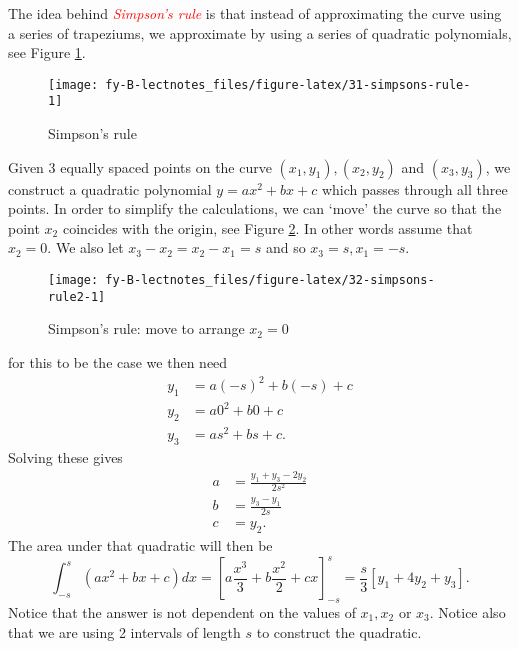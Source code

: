 \documentclass[
  11pt,
  oneside]{book}
\theoremstyle{definition}
\theoremstyle{definition}
\theoremstyle{definition}
\theoremstyle{definition}
\theoremstyle{remark}
\begin{document}
The idea behind \textcolor{red}{\em Simpson's rule} is that instead of approximating the curve using a series of trapeziums, we approximate by using a series of quadratic polynomials, see Figure \ref{fig:31-simpsons-rule}.

\begin{figure}

{\centering \texttt{[image: fy-B-lectnotes\_files/figure-latex/31-simpsons-rule-1]} 

}

\caption{Simpson's rule}\label{fig:31-simpsons-rule}
\end{figure}

Given 3 equally spaced points on the curve \((x_1,y_1), (x_2, y_2)\) and \((x_3,y_3)\), we construct a quadratic polynomial \(y=ax^2+bx+c\) which passes through all three points. In order to simplify the calculations, we can `move' the curve so that the point \(x_2\) coincides with the origin, see Figure \ref{fig:32-simpsons-rule2}. In other words assume that \(x_2=0\). We also let \(x_3-x_2=x_2-x_1=s\) and so \(x_3=s, x_1=-s\).

\begin{figure}

{\centering \texttt{[image: fy-B-lectnotes\_files/figure-latex/32-simpsons-rule2-1]} 

}

\caption{Simpson's rule: move to arrange $x_2=0$}\label{fig:32-simpsons-rule2}
\end{figure}

for this to be the case we then need
\begin{align*}
y_1&=a(-s)^2+b(-s)+c\\
y_2&=a0^2+b0+c\\
y_3&=as^2+bs+c.
\end{align*}
Solving these gives
\begin{align*}
a&=\frac{y_1+y_3-2y_2}{2s^2}\\
b&=\frac{y_3-y_1}{2s}\\
c&=y_2.
\end{align*}
The area under that quadratic will then be
\[
\int_{-s}^{s}(ax^2+bx+c)dx = \left[a\frac{x^3}3+b\frac{x^2}2+cx\right]_{-s}^{s}=\frac{s}{3}\left[y_1+4y_2+y_3\right].
\]
Notice that the answer is not dependent on the values of \(x_1, x_2\) or \(x_3\). Notice also that we are using 2 intervals of length \(s\) to construct the quadratic.
\end{document}
